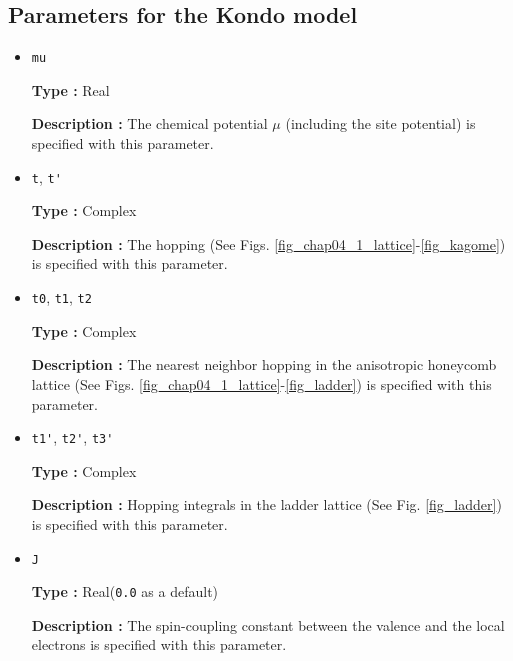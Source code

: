 \subsection{Parameters for the Kondo model}
\begin{itemize}
\item \verb|mu|

{\bf Type :} Real

{\bf Description :} The chemical potential $\mu$ (including the site potential)
is specified with this parameter.

\item \verb|t|, \verb|t'|

{\bf Type :} Complex

{\bf Description :} The hopping (See Figs. \ref{fig_chap04_1_lattice}-\ref{fig_kagome})
is specified with this parameter.

\item \verb|t0|, \verb|t1|, \verb|t2|

{\bf Type :} Complex

{\bf Description :} The nearest neighbor hopping 
in the anisotropic honeycomb lattice 
(See Figs. \ref{fig_chap04_1_lattice}-\ref{fig_ladder})
is specified with this parameter.

\item \verb|t1'|,  \verb|t2'|, \verb|t3'|

{\bf Type :} Complex

{\bf Description :} Hopping integrals
in the ladder lattice 
(See Fig. \ref{fig_ladder})
is specified with this parameter.

\item \verb|J|

{\bf Type :} Real(\verb|0.0| as a default)

{\bf Description :} The spin-coupling constant between the valence and the local electrons
is specified with this parameter.

\end{itemize}

